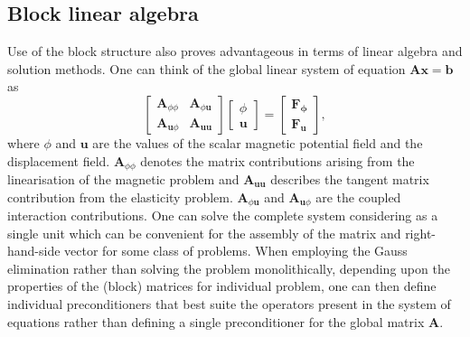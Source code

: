 \subsection{Block linear algebra} 
Use of the block structure also proves advantageous in terms of linear algebra and solution methods. One can think of the global linear system of equation $\mathbf{A}\mathbf{x} = \mathbf{b}$ as
\begin{equation*}
\begin{bmatrix}
\mathbf{A}_{\phi\phi} & \mathbf{A}_{\phi \mathbf{u}} \\
\mathbf{A}_{\mathbf{u} \phi} & \mathbf{A}_{\mathbf{u}\mathbf{u}} 
\end{bmatrix}
\begin{bmatrix}
\phi \\
\mathbf{u}
\end{bmatrix} 
= 
\begin{bmatrix}
\mathbf{F_{\phi}} \\
\mathbf{F_{\mathbf{u}}}
\end{bmatrix},
\end{equation*}
where $\phi$ and $\mathbf{u}$ are the values of the scalar magnetic potential field and the displacement field. $\mathbf{A}_{\phi\phi}$ denotes the matrix contributions arising from the linearisation of the magnetic problem and $\mathbf{A}_{\mathbf{u}\mathbf{u}}$ describes the tangent matrix contribution from the elasticity problem. $\mathbf{A}_{\phi \mathbf{u}}$ and $\mathbf{A}_{\mathbf{u} \phi}$ are the coupled interaction contributions. One can solve the complete system considering as a single unit which can be convenient for the assembly of the matrix and right-hand-side vector for some class of problems. When employing the Gauss elimination rather than solving the problem monolithically, depending upon the properties of the (block) matrices for individual problem, one can then define individual preconditioners that best suite the operators present in the system of equations rather than defining a single preconditioner for the global matrix $\mathbf{A}$.

